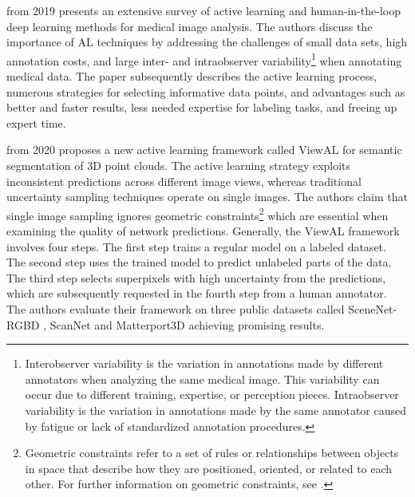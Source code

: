  \cite{DBLP:journals/corr/abs-1910-02923} from 2019 presents an extensive survey of active learning and human-in-the-loop deep learning methods for medical image analysis. The authors discuss the importance of \ac{AL} techniques by addressing the challenges of small data sets, high annotation costs, and large inter- and intraobserver variability\footnote{Interobserver variability is the variation in annotations made by different annotators when analyzing the same medical image. This variability can occur due to different training, expertise, or perception pieces. Intraobserver variability is the variation in annotations made by the same annotator caused by fatigue or lack of standardized annotation procedures.\cite{hopper1996analysis}} when annotating medical data. The paper subsequently describes the active learning process, numerous strategies for selecting informative data points, and advantages such as better and faster results, less needed expertise for labeling tasks, and freeing up expert time.

 \cite{Siddiqui_2020_CVPR} from 2020 proposes a new active learning framework called ViewAL for semantic segmentation of 3D point clouds. The active learning strategy exploits inconsistent predictions across different image views, whereas traditional uncertainty sampling techniques operate on single images. The authors claim that single image sampling ignores geometric constraints\footnote{Geometric constraints refer to a set of rules or relationships between objects in space that describe how they are positioned, oriented, or related to each other. For further information on geometric constraints, see \cite{grimson1991object}.} which are essential when examining the quality of network predictions. Generally, the ViewAL framework involves four steps. The first step trains a regular model on a labeled dataset. The second step uses the trained model to predict unlabeled parts of the data. The third step selects superpixels with high uncertainty from the predictions, which are subsequently requested in the fourth step from a human annotator. The authors evaluate their framework on three public datasets called SceneNet-RGBD \cite{McCormac:etal:ICCV2017}, ScanNet\cite{dai2017scannet} and Matterport3D\cite{Matterport3D} achieving promising results.


